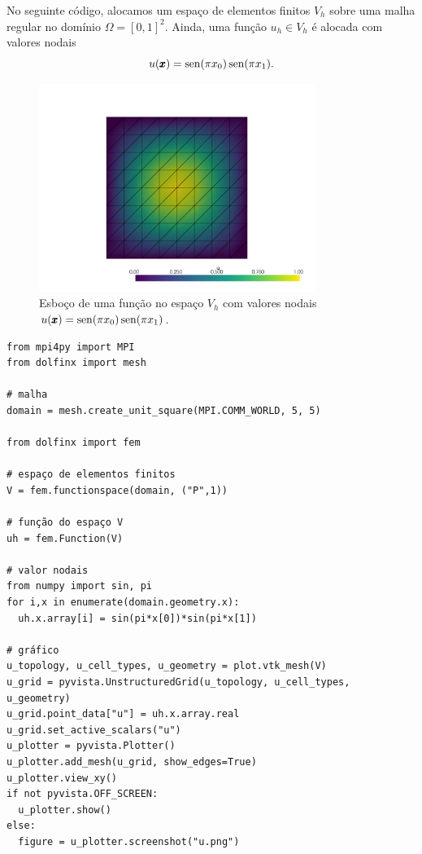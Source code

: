 \begin{ex}\label{cap_mef2d_sec_malha:ex:espaço}
No seguinte código, alocamos um espaço de elementos finitos $V_h$ sobre uma malha regular no domínio $\Omega=[0,1]^2$. Ainda, uma função $u_h\in V_h$ é alocada com valores nodais
\begin{equation}
  u(\pmb{x}) = \operatorname{sen}(\pi x_0)\operatorname{sen}(\pi x_1).
\end{equation}

\begin{figure}
  \centering
  \includegraphics[width=0.8\textwidth]{./cap_mef2d/dados/ex_espaco/fig}
  \caption{Esboço de uma função no espaço $V_h$ com valores nodais $u(\pmb{x}) = \operatorname{sen}(\pi x_0)\operatorname{sen}(\pi x_1)$.}
\end{figure}

\begin{lstlisting}
from mpi4py import MPI
from dolfinx import mesh

# malha
domain = mesh.create_unit_square(MPI.COMM_WORLD, 5, 5)

from dolfinx import fem

# espaço de elementos finitos
V = fem.functionspace(domain, ("P",1))

# função do espaço V
uh = fem.Function(V)

# valor nodais
from numpy import sin, pi
for i,x in enumerate(domain.geometry.x):
  uh.x.array[i] = sin(pi*x[0])*sin(pi*x[1])

# gráfico
u_topology, u_cell_types, u_geometry = plot.vtk_mesh(V)
u_grid = pyvista.UnstructuredGrid(u_topology, u_cell_types, u_geometry)
u_grid.point_data["u"] = uh.x.array.real
u_grid.set_active_scalars("u")
u_plotter = pyvista.Plotter()
u_plotter.add_mesh(u_grid, show_edges=True)
u_plotter.view_xy()
if not pyvista.OFF_SCREEN:
  u_plotter.show()
else:
  figure = u_plotter.screenshot("u.png")
\end{lstlisting}
\end{ex}

